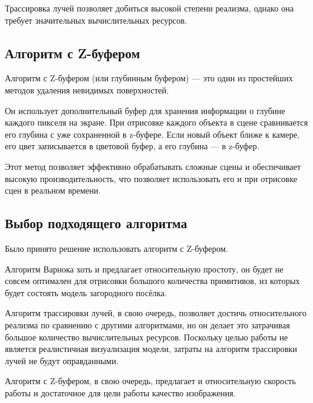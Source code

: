 Трассировка лучей позволяет добиться высокой степени реализма, однако она требует значительных вычислительных ресурсов.

\subsection{Алгоритм с Z-буфером}

Алгоритм с Z-буфером (или глубинным буфером) --- это один из простейших~\cite{Rogers} методов удаления невидимых поверхностей. 

Он использует дополнительный буфер для хранения информации о глубине каждого пикселя на экране. При отрисовке каждого объекта в сцене сравнивается его глубина с уже сохраненной в z-буфере. Если новый объект ближе к камере, его цвет записывается в цветовой буфер, а его глубина — в z-буфер. 

Этот метод позволяет эффективно обрабатывать сложные сцены и обеспечивает высокую производительность, что позволяет использовать его и при отрисовке сцен в реальном времени.

\subsection{Выбор подходящего алгоритма}

Было принято решение использовать алгоритм с Z-буфером. 

Алгоритм Варнока хоть и предлагает относительную простоту, он будет не совсем оптимален для отрисовки большого количества примитивов, из которых будет состоять модель загородного посёлка.

Алгоритм трассировки лучей, в свою очередь, позволяет достичь относительного реализма по сравнению с другими алгоритмами, но он делает это затрачивая большое количество вычислительных ресурсов. Поскольку целью работы не является реалистичная визуализация модели, затраты на алгоритм трассировки лучей не будут оправданными.

Алгоритм с Z-буфером, в свою очередь, предлагает и относительную скорость работы и достаточное для цели работы качество изображения.